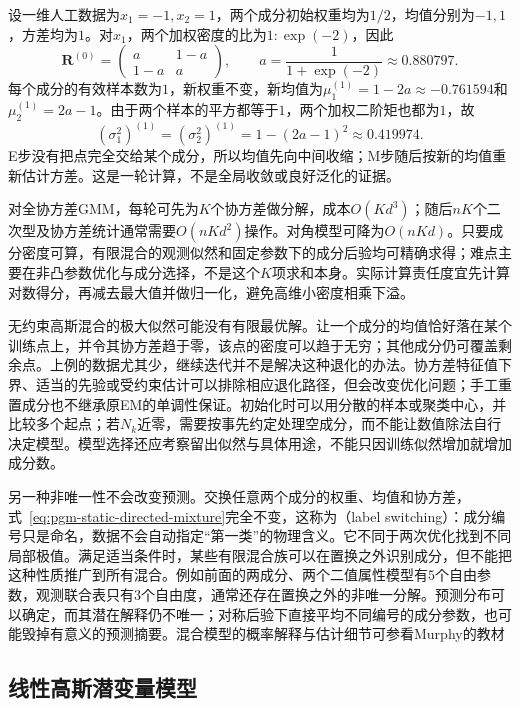 \begin{example}[一轮可复核的高斯混合EM]
  \label{ex:pgm-static-directed-gmm-em}
  设一维人工数据为$x_1=-1,x_2=1$，两个成分初始权重均为$1/2$，均值分别为$-1,1$，方差均为$1$。对$x_1$，两个加权密度的比为$1:\exp(-2)$，因此
  \[
    \bm{R}^{(0)}
      =\begin{pmatrix}a&1-a\\1-a&a\end{pmatrix},
    \qquad a=\frac{1}{1+\exp(-2)}\approx0.880797.
  \]
  每个成分的有效样本数为$1$，新权重不变，新均值为$\mu_1^{(1)}=1-2a\approx-0.761594$和$\mu_2^{(1)}=2a-1$。由于两个样本的平方都等于$1$，两个加权二阶矩也都为$1$，故
  \[
    (\sigma_1^2)^{(1)}=(\sigma_2^2)^{(1)}
      =1-(2a-1)^2\approx0.419974.
  \]
  E步没有把点完全交给某个成分，所以均值先向中间收缩；M步随后按新的均值重新估计方差。这是一轮计算，不是全局收敛或良好泛化的证据。
\end{example}

对全协方差GMM，每轮可先为$K$个协方差做分解，成本$O(Kd^3)$；随后$nK$个二次型及协方差统计通常需要$O(nKd^2)$操作。对角模型可降为$O(nKd)$。只要成分密度可算，有限混合的观测似然和固定参数下的成分后验均可精确求得；难点主要在非凸参数优化与成分选择，不是这个$K$项求和本身。实际计算责任度宜先计算对数得分，再减去最大值并做归一化，避免高维小密度相乘下溢。

无约束高斯混合的极大似然可能没有有限最优解。让一个成分的均值恰好落在某个训练点上，并令其协方差趋于零，该点的密度可以趋于无穷；其他成分仍可覆盖剩余点。上例的数据尤其少，继续迭代并不是解决这种退化的办法。协方差特征值下界、适当的先验或受约束估计可以排除相应退化路径，但会改变优化问题；手工重置成分也不继承原EM的单调性保证。初始化时可以用分散的样本或聚类中心，并比较多个起点；若$N_k$近零，需要按事先约定处理空成分，而不能让数值除法自行决定模型。模型选择还应考察留出似然与具体用途，不能只因训练似然增加就增加成分数。

另一种非唯一性不会改变预测。交换任意两个成分的权重、均值和协方差，式~\eqref{eq:pgm-static-directed-mixture}完全不变，这称为（label switching）：成分编号只是命名，数据不会自动指定“第一类”的物理含义。它不同于两次优化找到不同局部极值。满足适当条件时，某些有限混合族可以在置换之外识别成分，但不能把这种性质推广到所有混合。例如前面的两成分、两个二值属性模型有$5$个自由参数，观测联合表只有$3$个自由度，通常还存在置换之外的非唯一分解。预测分布可以确定，而其潜在解释仍不唯一；对称后验下直接平均不同编号的成分参数，也可能毁掉有意义的预测摘要。混合模型的概率解释与估计细节可参看Murphy的教材

\subsection{线性高斯潜变量模型}
\label{sec:pgm-static-directed-linear-gaussian}

